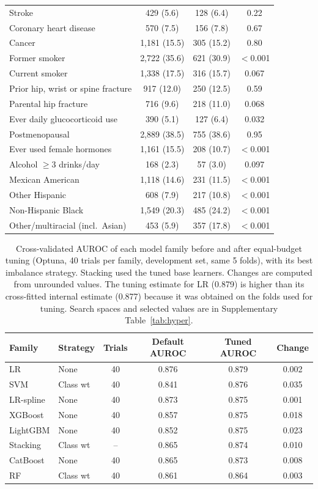 \documentclass[11pt,a4paper]{article}
\begin{document}
{\begin{longtable}{lccc}
Stroke & 429 (5.6) & 128 (6.4) & 0.22 \\
Coronary heart disease & 570 (7.5) & 156 (7.8) & 0.67 \\
Cancer & 1,181 (15.5) & 305 (15.2) & 0.80 \\
Former smoker & 2,722 (35.6) & 621 (30.9) & $<$0.001 \\
Current smoker & 1,338 (17.5) & 316 (15.7) & 0.067 \\
Prior hip, wrist or spine fracture & 917 (12.0) & 250 (12.5) & 0.59 \\
Parental hip fracture & 716 (9.6) & 218 (11.0) & 0.068 \\
Ever daily glucocorticoid use & 390 (5.1) & 127 (6.4) & 0.032 \\
Postmenopausal & 2,889 (38.5) & 755 (38.6) & 0.95 \\
Ever used female hormones & 1,161 (15.5) & 208 (10.7) & $<$0.001 \\
Alcohol $\ge$3 drinks/day & 168 (2.3) & 57 (3.0) & 0.097 \\
Mexican American & 1,118 (14.6) & 231 (11.5) & $<$0.001 \\
Other Hispanic & 608 (7.9) & 217 (10.8) & $<$0.001 \\
Non-Hispanic Black & 1,549 (20.3) & 485 (24.2) & $<$0.001 \\
Other/multiracial (incl.\ Asian) & 453 (5.9) & 357 (17.8) & $<$0.001 \\
\end{longtable}}

\begin{table}[H]
\centering
\caption{Cross-validated AUROC of each model family before and after equal-budget tuning (Optuna, 40 trials per family, development set, same 5 folds), with its best imbalance strategy. Stacking used the tuned base learners. Changes are computed from unrounded values. The tuning estimate for LR (0.879) is higher than its cross-fitted internal estimate (0.877) because it was obtained on the folds used for tuning. Search spaces and selected values are in Supplementary Table~\ref{tab:hyper}.}
\label{tab:tuned}
\small
\begin{tabular}{llcccc}
\toprule
Family & Strategy & Trials & Default AUROC & Tuned AUROC & Change \\
\midrule
LR & None & 40 & 0.876 & 0.879 & 0.002 \\
SVM & Class wt & 40 & 0.841 & 0.876 & 0.035 \\
LR-spline & None & 40 & 0.873 & 0.875 & 0.001 \\
XGBoost & None & 40 & 0.857 & 0.875 & 0.018 \\
LightGBM & None & 40 & 0.852 & 0.875 & 0.023 \\
Stacking & Class wt & -- & 0.865 & 0.874 & 0.010 \\
CatBoost & None & 40 & 0.865 & 0.873 & 0.008 \\
RF & Class wt & 40 & 0.861 & 0.864 & 0.003 \\
\bottomrule
\end{tabular}
\end{table}
\end{document}
